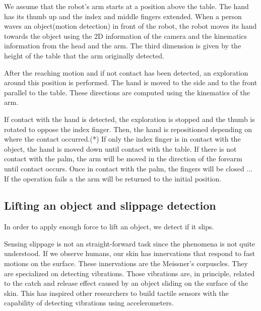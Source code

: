 We assume that the robot's arm starts at a position above the
table. The hand has its thumb up and the index and middle fingers
extended. When a person waves an object(motion
detection\cite{kemp-thesis}) in front of the robot, the robot
moves its hand towards the object using the 2D information of the
camera and the kinematics information from the head and the arm.
The third dimension is given by the height of the table that the
arm originally detected.

After the reaching motion and if not contact has been detected, an
exploration around this position is performed. The hand is moved
to the side and to the front parallel to the table. These
directions are computed using the kinematics of the arm.

If contact with the hand is detected, the exploration is stopped
and the thumb is rotated to oppose the index finger. Then, the
hand is repositioned depending on where the contact occurred.(*)
If only the index finger is in contact with the object, the hand
is moved down until contact with the table.
%
If there is not contact with the palm, the arm will be moved in
the direction of the forearm until contact occurs.
%
Once in contact with the palm, the fingers will be closed ...
%
If the operation fails a the arm will be returned to the initial
position.

\subsection{Lifting an object and slippage detection}
In order to apply enough force to lift an object, we detect if it
slips.


Sensing slippage is not an straight-forward task since the
phenomena is not quite understood. If we observe humans, our skin
has innervations that respond to fast motions on the surface.
These innervations are the Meissner's corpuscles. They are
specialized on detecting vibrations. Those vibrations are, in
principle, related to the catch and release effect caused by an
object sliding on the surface of the skin. This has inspired other
researchers to build tactile sensors with the capability of
detecting vibrations using accelerometers\cite{howe89sensing}.

